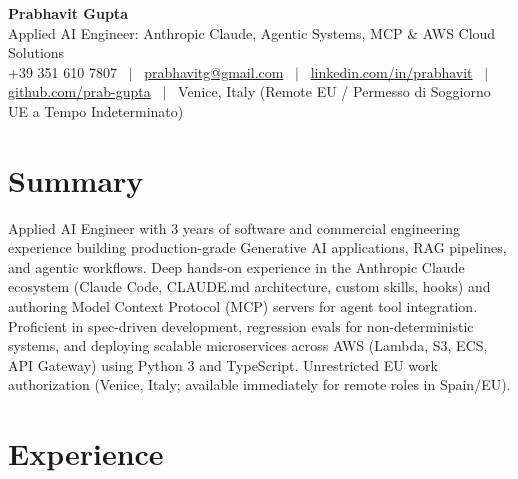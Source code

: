 \documentclass[a4paper,10pt]{article}
\begin{document}
\begin{minipage}[c]{0.80\textwidth}
  {\Huge\bfseries Prabhavit Gupta}\\[3pt]
  {\color{accent}\large Applied AI Engineer: Anthropic Claude, Agentic Systems, MCP \& AWS Cloud Solutions}\\[6pt]
  {\footnotesize +39 351 610 7807 ~$\vert$~
  \href{mailto:prabhavitg@gmail.com}{prabhavitg@gmail.com} ~$\vert$~
  \href{https://www.linkedin.com/in/prabhavit/}{linkedin.com/in/prabhavit} ~$\vert$~
  \href{https://github.com/prab-gupta}{github.com/prab-gupta} ~$\vert$~
  Venice, Italy (Remote EU / Permesso di Soggiorno UE a Tempo Indeterminato)}
\end{minipage}\hfill

\section{Summary}
Applied AI Engineer with 3 years of software and commercial engineering experience building production-grade Generative AI applications, RAG pipelines, and agentic workflows. Deep hands-on experience in the Anthropic Claude ecosystem (Claude Code, CLAUDE.md architecture, custom skills, hooks) and authoring Model Context Protocol (MCP) servers for agent tool integration. Proficient in spec-driven development, regression evals for non-deterministic systems, and deploying scalable microservices across AWS (Lambda, S3, ECS, API Gateway) using Python 3 and TypeScript. Unrestricted EU work authorization (Venice, Italy; available immediately for remote roles in Spain/EU).

\section{Experience}
\end{document}
